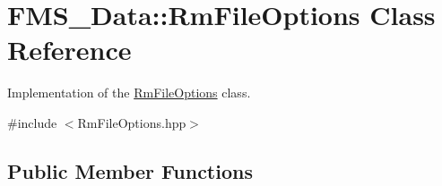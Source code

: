 \hypertarget{classFMS__Data_1_1RmFileOptions}{
\section{FMS\_\-Data::RmFileOptions Class Reference}
\label{classFMS__Data_1_1RmFileOptions}
}


Implementation of the \hyperlink{classFMS__Data_1_1RmFileOptions}{RmFileOptions} class.  




{\ttfamily \#include $<$RmFileOptions.hpp$>$}

\subsection*{Public Member Functions}
